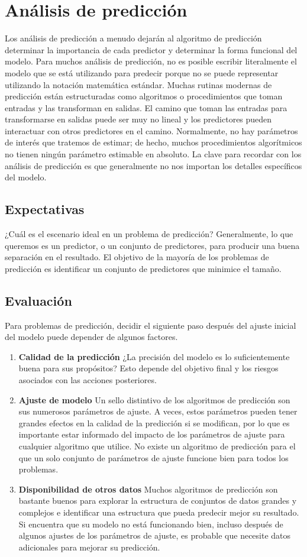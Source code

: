 \documentclass[10pt]{book}
\begin{document}
    \section{Análisis de predicción}
    Los análisis de predicción a menudo dejarán al algoritmo de predicción determinar la importancia de cada predictor y determinar la forma funcional del modelo. Para muchos análisis de predicción, no es posible escribir literalmente el modelo que se está utilizando para predecir porque no se puede representar utilizando la notación matemática estándar. Muchas rutinas modernas de predicción están estructuradas como algoritmos o procedimientos que toman entradas y las transforman en salidas. El camino que toman las entradas para transformarse en salidas puede ser muy no lineal y los predictores pueden interactuar con otros predictores en el camino. Normalmente, no hay parámetros de interés que tratemos de estimar; de hecho, muchos procedimientos algorítmicos no tienen ningún parámetro estimable en absoluto. La clave para recordar con los análisis de predicción es que generalmente no nos importan los detalles específicos del modelo.
	\subsection{Expectativas}
	¿Cuál es el escenario ideal en un problema de predicción? Generalmente, lo que queremos es un predictor, o un conjunto de predictores, para producir una buena separación en el resultado. El objetivo de la mayoría de los problemas de predicción es identificar un conjunto de predictores que minimice el tamaño.
	\subsection{Evaluación}
	Para problemas de predicción, decidir el siguiente paso después del ajuste inicial del modelo puede depender de algunos factores.
	\begin{enumerate}[\bfseries 1.]
	    \item \textbf{Calidad de la predicción} ¿La precisión del modelo es lo suficientemente buena para sus propósitos? Esto depende del objetivo final y los riesgos asociados con las acciones posteriores.
	    \item \textbf{Ajuste de modelo} Un sello distintivo de los algoritmos de predicción son sus numerosos parámetros de ajuste. A veces, estos parámetros pueden tener grandes efectos en la calidad de la predicción si se modifican, por lo que es importante estar informado del impacto de los parámetros de ajuste para cualquier algoritmo que utilice. No existe un algoritmo de predicción para el que un solo conjunto de parámetros de ajuste funcione bien para todos los problemas.
	    \item \textbf{Disponibilidad de otros datos} Muchos algoritmos de predicción son bastante buenos para explorar la estructura de conjuntos de datos grandes y complejos e identificar una estructura que pueda predecir mejor su resultado. Si encuentra que su modelo no está funcionando bien, incluso después de algunos ajustes de los parámetros de ajuste, es probable que necesite datos adicionales para mejorar su predicción.
	\end{enumerate}
\end{document}
